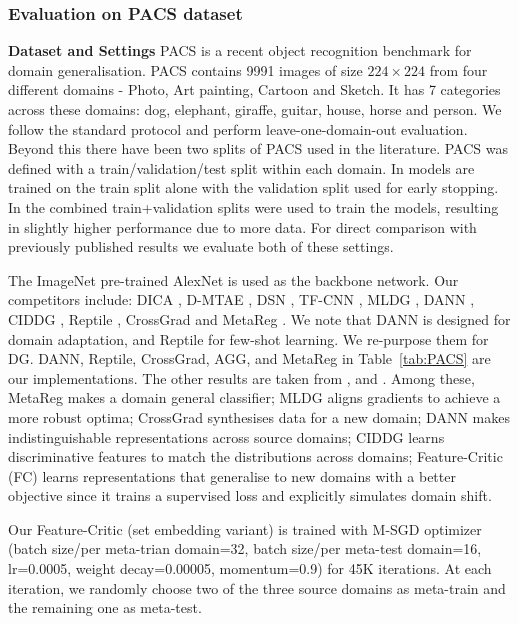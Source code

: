 \documentclass{article}
\newcommand{\modelname}{Feature-Critic}
\newcommand{\keypoint}[1]{\vspace{0.0cm}\noindent\textbf{#1}\quad}
\begin{document}
\subsubsection{Evaluation on PACS dataset}
\keypoint{Dataset and Settings} PACS \cite{Lida17} is a recent object recognition benchmark for domain generalisation. PACS contains 9991 images of size $224\times 224$ from four different domains - Photo, Art painting, Cartoon and Sketch. It has 7 categories across these domains: dog, elephant, giraffe, guitar, house, horse and person. We follow the standard protocol and perform leave-one-domain-out evaluation. Beyond this there have been two splits of PACS used in the literature.  PACS was defined with a train/validation/test split within each domain. In \citet{Li18} models are trained on the train split alone with the validation split used for early stopping. In \citet{Balaji18} the combined train+validation splits were used to train the models, resulting in slightly higher performance due to more data. For direct comparison with previously published results we evaluate both of these settings.

The ImageNet pre-trained AlexNet \cite{Krizhevsky12} is used as the backbone network. Our competitors include: DICA \cite{Muandet13}, D-MTAE \cite{Ghifary15}, DSN \cite{Bousmalis16}, TF-CNN \cite{Lida17}, MLDG \cite{Li18}, DANN \cite{Ganin16}, CIDDG \cite{LiY18conditional}, Reptile \cite{nichol2018reptileFOML}, CrossGrad \cite{Shankar18} and MetaReg \cite{Balaji18}. We note that DANN is designed for domain adaptation, and Reptile for few-shot learning. We re-purpose them for DG. DANN, Reptile,  CrossGrad, AGG, and MetaReg in Table~\ref{tab:PACS} are our implementations. The other results are taken from \citet{Li18}, \citet{LiY18conditional} and \citet{Balaji18}. Among these, MetaReg makes a domain general classifier; MLDG aligns gradients to achieve a more robust optima; CrossGrad synthesises data for a new domain; DANN makes indistinguishable representations across source domains; CIDDG learns discriminative features to match the distributions across domains; \modelname{} (FC) learns representations that generalise to new domains with a better objective since it trains a supervised loss and explicitly simulates domain shift.

Our \modelname{} (set embedding variant) is trained with M-SGD optimizer (batch size/per meta-trian domain=32, batch size/per meta-test domain=16, lr=0.0005, weight decay=0.00005, momentum=0.9) for 45K iterations. At each iteration, we randomly choose two of the three source domains as meta-train and the remaining one as meta-test.
 
\end{document}

